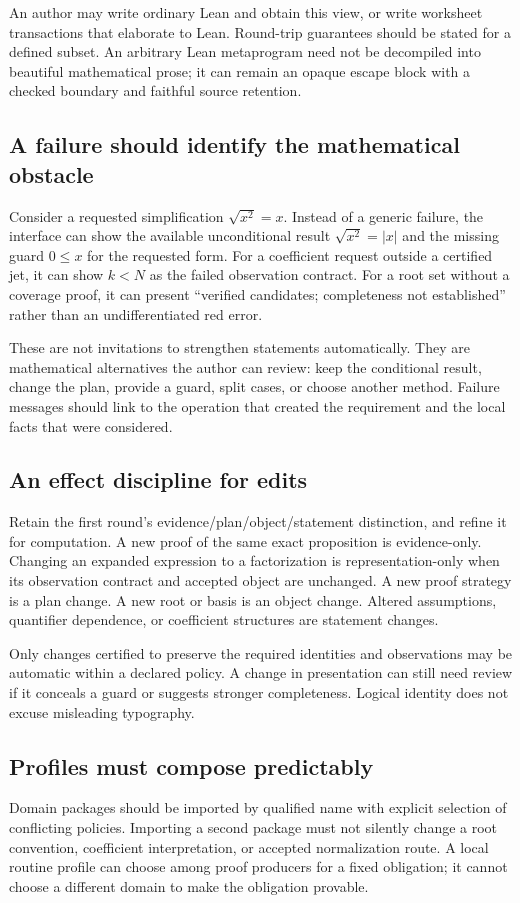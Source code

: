 \documentclass[11pt,a4paper]{article}
\theoremstyle{definition}
\begin{document}
An author may write ordinary Lean and obtain this view, or write worksheet
transactions that elaborate to Lean. Round-trip guarantees should be stated for
a defined subset. An arbitrary Lean metaprogram need not be decompiled into
beautiful mathematical prose; it can remain an opaque escape block with a
checked boundary and faithful source retention.

\subsection{A failure should identify the mathematical obstacle}
Consider a requested simplification $\sqrt{x^2}=x$. Instead of a generic failure,
the interface can show the available unconditional result $\sqrt{x^2}=|x|$ and
the missing guard $0\le x$ for the requested form. For a coefficient request
outside a certified jet, it can show $k<N$ as the failed observation contract.
For a root set without a coverage proof, it can present ``verified candidates;
completeness not established'' rather than an undifferentiated red error.

These are not invitations to strengthen statements automatically. They are
mathematical alternatives the author can review: keep the conditional result,
change the plan, provide a guard, split cases, or choose another method. Failure
messages should link to the operation that created the requirement and the
local facts that were considered.

\subsection{An effect discipline for edits}
Retain the first round's evidence/plan/object/statement distinction, and refine
it for computation. A new proof of the same exact proposition is evidence-only.
Changing an expanded expression to a factorization is representation-only when
its observation contract and accepted object are unchanged. A new proof strategy
is a plan change. A new root or basis is an object change. Altered assumptions,
quantifier dependence, or coefficient structures are statement changes.

Only changes certified to preserve the required identities and observations
may be automatic within a declared policy. A change in presentation can still
need review if it conceals a guard or suggests stronger completeness. Logical
identity does not excuse misleading typography.

\subsection{Profiles must compose predictably}
Domain packages should be imported by qualified name with explicit selection of
conflicting policies. Importing a second package must not silently change a
root convention, coefficient interpretation, or accepted normalization route.
A local routine profile can choose among proof producers for a fixed obligation;
it cannot choose a different domain to make the obligation provable.
\end{document}
